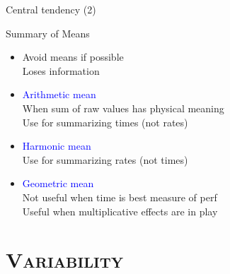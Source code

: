 \documentclass[xcolor=x11names,compress,8pt,
handout
]{beamer}
\renewcommand{\(}{\begin{columns}}
\renewcommand{\)}{\end{columns}}
\newcommand{\<}[1]{\begin{column}{#1}}
\renewcommand{\>}{\end{column}}
\begin{document}
\begin{frame}{Central tendency (2)}
\begin{block}{Summary of Means}
\begin{itemize}
\item Avoid means if possible\\
Loses information
\item  \textcolor{blue}{Arithmetic mean}\\
 When sum of raw values has physical meaning\\
Use for summarizing times (not rates)
\item \textcolor{blue}{Harmonic mean}\\
Use for summarizing rates (not times)
\item \textcolor{blue}{Geometric mean}\\
 Not useful when time is best measure of perf\\
 Useful when multiplicative effects are in play
\end{itemize}
\end{block}
\end{frame}
\section[{\scshape Variability}]{{\scshape Variability}}
\end{document}
